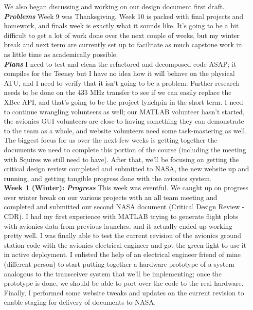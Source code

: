 \documentclass[onecolumn, draftclsnofoot, 10pt, compsoc]{IEEEtran}
\begin{document}
We also began discussing and working on our design document first draft. \\

\textbf{\textit{{Problems}}}
\newline Week 9 was Thanksgiving, Week 10 is packed with final projects and homework, and finals week is exactly
what it sounds like. It's going to be a bit difficult to get a lot of work done over the next couple of
weeks, but my winter break and next term are currently set up to facilitate as much capstone work in as
little time as academically possible. \\

\textbf{\textit{{Plans}}}
\newline I need to test and clean the refactored and decomposed code ASAP; it compiles for the Teensy but I have
no idea how it will behave on the physical ATU, and I need to verify that it isn't going to be a problem.
Further research needs to be done on the 433 MHz transfer to see if we can easily replace the XBee API,
and that's going to be the project lynchpin in the short term. I need to continue wrangling volunteers 
as well; our MATLAB volunteer hasn't started, the avionics GUI volunteers are close to having something
they can demonstrate to the team as a whole, and website volunteers need some task-mastering as well. \\

The biggest focus for us over the next few weeks is getting together the documents we need
to complete this portion of the course (including the meeting with Squires we still need to have).
After that, we'll be focusing on getting the critical design review completed and submitted to NASA, 
the new website up and running, and getting tangible progress done with the avionics system. \\

\underline{\textbf{Week 1 (Winter):}}
\newline\textbf{\textit{{Progress}}}
\newline This week was eventful. We caught up on progress over winter break on our various projects with an all team meeting and completed and submitted our second NASA document (Critical Design Review - CDR). I had my first experience with MATLAB trying to generate flight plots with avionics data from previous launches, and it actually ended up working pretty well. I was finally able to test the current revision of the avionics ground station code with the avionics electrical engineer and got the green light to use it in active deployment. I enlisted the help of an electrical engineer friend of mine (different person) to start putting together a hardware prototype of a system analogous to the transceiver system that we'll be implementing; once the prototype is done, we should be able to port over the code to the real hardware. Finally, I performed some website tweaks and updates on the current revision to enable staging for delivery of documents to NASA. \\
\end{document}
